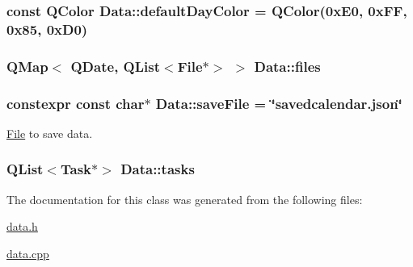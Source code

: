 \subsubsection[{\texorpdfstring{default\+Day\+Color}{defaultDayColor}}]{\setlength{\rightskip}{0pt plus 5cm}const Q\+Color Data\+::default\+Day\+Color = Q\+Color(0x\+E0, 0x\+F\+F, 0x85, 0x\+D0)}\hypertarget{classData_a5baa18f96bc11fe93566709af7fe16ba}{}\label{classData_a5baa18f96bc11fe93566709af7fe16ba}
\subsubsection[{\texorpdfstring{files}{files}}]{\setlength{\rightskip}{0pt plus 5cm}Q\+Map$<$ Q\+Date, Q\+List$<${\bf File}$\ast$$>$ $>$ Data\+::files\hspace{0.3cm}{\ttfamily [private]}}\hypertarget{classData_a5c3557bd928d1681876b174a5d7c3db9}{}\label{classData_a5c3557bd928d1681876b174a5d7c3db9}
\subsubsection[{\texorpdfstring{save\+File}{saveFile}}]{\setlength{\rightskip}{0pt plus 5cm}constexpr const char$\ast$ Data\+::save\+File = \char`\"{}savedcalendar.\+json\char`\"{}\hspace{0.3cm}{\ttfamily [static]}}\hypertarget{classData_a6781153c24e007e3540acf077fcbd2f7}{}\label{classData_a6781153c24e007e3540acf077fcbd2f7}


\hyperlink{classFile}{File} to save data. 

\subsubsection[{\texorpdfstring{tasks}{tasks}}]{\setlength{\rightskip}{0pt plus 5cm}Q\+List$<${\bf Task}$\ast$$>$ Data\+::tasks\hspace{0.3cm}{\ttfamily [private]}}\hypertarget{classData_a532f7e91418f13e2f67dd3a47ff890f4}{}\label{classData_a532f7e91418f13e2f67dd3a47ff890f4}


The documentation for this class was generated from the following files\+:\begin{DoxyCompactItemize}
\item 
\hyperlink{data_8h}{data.\+h}\item 
\hyperlink{data_8cpp}{data.\+cpp}\end{DoxyCompactItemize}
